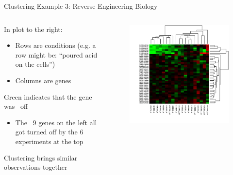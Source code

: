 \documentclass[aspectratio=169]{../latex_main/tntbeamer}  %
\begin{document}
	
	
	\begin{frame}{Clustering Example 3: Reverse Engineering Biology}
	    \begin{columns}
	    

	        \begin{column}{.5\textwidth}
	               In plot to the right:
	               \begin{itemize}
	                   \item Rows are conditions (e.g. a row might be: “poured acid on the cells”)
	                   \item Columns are genes
	               \end{itemize}
	                   
	                   \bigskip
	                   Green indicates that the gene was ~off
	                   \begin{itemize}
	                       \item The ~9 genes on the left all got turned off by the 6 experiments at the top
	                   \end{itemize}
	                   
	                   \bigskip
                        Clustering brings similar observations together

	        \end{column}
	        
	        
	        \begin{column}{.5\textwidth}
	                 \begin{figure}
	                    \centering
	                    \includegraphics[scale=.6]{Bild6}
	                \end{figure}
	        \end{column}
	    \end{columns}
	\end{frame}
\end{document}
